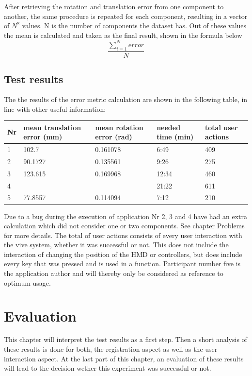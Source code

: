 \documentclass[hyperref,english,bachelorofscience,bibnum,twoside]{cgvpub}
\begin{document}
After retrieving the rotation and translation error from one component to another, the same procedure is repeated for each component, resulting in a vector of $N^2$ values. N is the number of components the dataset has. Out of these values the mean is calculated and taken as the final result, shown in the formula below
\[
\frac{\sum_{i=1}^{N}error}{N}
\]

\section{Test results}

The the results of the error metric calculation are shown in the following table, in line with other useful information:

\begin{table}[!h]
\begin{tabular}{|l|l|l|l|l|} \hline
Nr & mean translation error (mm) & mean rotation error (rad) & needed time (min) & total user actions \\ \hline
1 & 102.7 & 0.161078 & 6:49 & 409 \\
2 & 90.1727 & 0.135561 & 9:26 & 275 \\
3 & 123.615 & 0.169968 & 12:34 & 460 \\
4 &  &  & 21:22 & 611 \\
5 & 77.8557 & 0.114094 & 7:12 & 210 \\ \hline
\end{tabular}
\end{table}

Due to a bug during the execution of application Nr 2, 3 and 4 have had an extra calculation which did not consider one or two components. See chapter Problems for more details.
The total of user actions consists of every user interaction with the vive system, whether it was successful or not. This does not include the interaction of changing the position of the HMD or controllers, but does include every key that was pressed and is used in a function.
Participant number five is the application author and will thereby only be considered as reference to optimum usage.

\chapter{Evaluation}

This chapter will interpret the test results as a first step. Then a short analysis of these results is done for both, the registration aspect as well as the user interaction aspect. At the last part of this chapter, an evaluation of these results will lead to the decision wether this experiment was successful or not.
\end{document}
